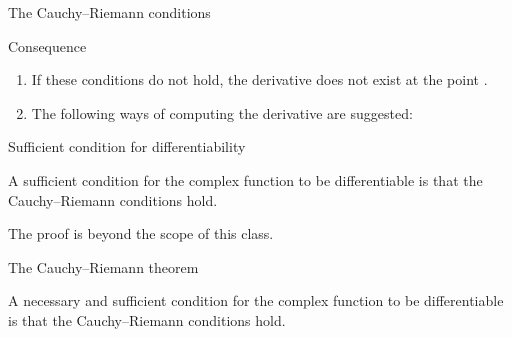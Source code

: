 
\begin{EMimportant}{The Cauchy--Riemann conditions}


\end{EMimportant}

\begin{EMremark}{Consequence}

\begin{enumerate}
\def\labelenumi{\arabic{enumi}.}
\tightlist
\item
  If these conditions do not hold, the derivative does not exist at the point .
\item
  The following ways of computing the derivative are suggested:
\end{enumerate}

\end{EMremark}

\begin{EMtheorem}{Sufficient condition for differentiability}

A sufficient condition for the complex function  to be differentiable is that the Cauchy--Riemann conditions hold.

The proof is beyond the scope of this class.

\end{EMtheorem}

\begin{EMtheorem}{The Cauchy--Riemann theorem}

A necessary and sufficient condition for the complex function  to be differentiable is that the Cauchy--Riemann conditions hold.

\end{EMtheorem}

